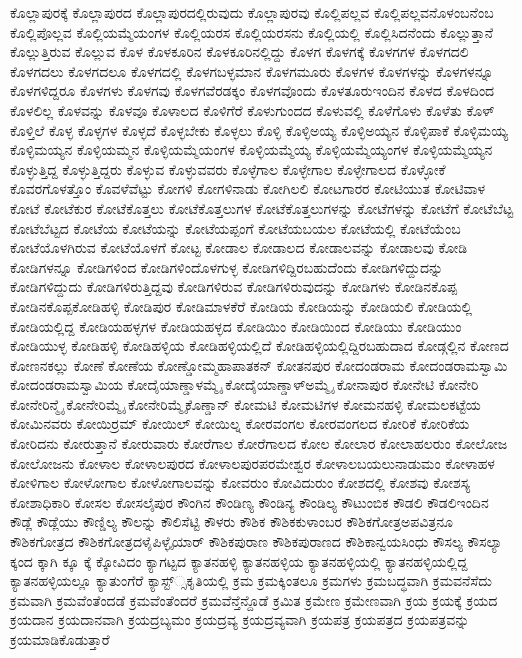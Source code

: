 {ಕೊಲ್ಲಾಪುರಕ್ಕೆ
ಕೊಲ್ಲಾಪುರದ
ಕೊಲ್ಲಾಪುರದಲ್ಲಿರುವುದು
ಕೊಲ್ಲಾಪುರವು
ಕೊಲ್ಲಿಪಲ್ಲವ
ಕೊಲ್ಲಿಪಲ್ಲವನೊಳಂಬನೆಂಬ
ಕೊಲ್ಲಿಪೊಲ್ಲವ
ಕೊಲ್ಲಿಯಮ್ಮೆಯಂಗಳ
ಕೊಲ್ಲಿಯರಸ
ಕೊಲ್ಲಿಯರಸನು
ಕೊಲ್ಲಿಯಲ್ಲಿ
ಕೊಲ್ಲಿಸಿದನೆಂದು
ಕೊಲ್ಲುತ್ತಾನೆ
ಕೊಲ್ಲುತ್ತಿರುವ
ಕೊಲ್ಲುವ
ಕೊಳ
ಕೊಳಕೂರಿನ
ಕೊಳಕೂರಿನಲ್ಲಿದ್ದು
ಕೊಳಗ
ಕೊಳಗಕ್ಕೆ
ಕೊಳಗಗಳ
ಕೊಳಗದಲಿ
ಕೊಳಗದಲು
ಕೊಳಗದಲೂ
ಕೊಳಗದಲ್ಲಿ
ಕೊಳಗಬಳ್ಳಮಾನ
ಕೊಳಗಮೂರು
ಕೊಳಗಳ
ಕೊಳಗಳನ್ನು
ಕೊಳಗಳನ್ನೂ
ಕೊಳಗಳಿದ್ದರೂ
ಕೊಳಗಳು
ಕೊಳಗವು
ಕೊಳಗವೆರಡಕ್ಕಂ
ಕೊಳಗವೊಂದು
ಕೊಳತೂರುಇಂದಿನ
ಕೊಳದ
ಕೊಳದಿಂದ
ಕೊಳಲಿಲ್ಲ
ಕೊಳವನ್ನು
ಕೊಳವೂ
ಕೊಳಾಲದ
ಕೊಳಿಗೆರೆ
ಕೊಳುಗುಂದದ
ಕೊಳುವಲ್ಲಿ
ಕೊಳೆಗೊಳು
ಕೊಳೆತು
ಕೊಳ್
ಕೊಳ್ತಿಲೆ
ಕೊಳ್ಳ
ಕೊಳ್ಳಗಳ
ಕೊಳ್ಳದೆ
ಕೊಳ್ಳಬೇಕು
ಕೊಳ್ಳಲು
ಕೊಳ್ಳಿ
ಕೊಳ್ಳಿಅಯ್ಯ
ಕೊಳ್ಳಿಅಯ್ಯನ
ಕೊಳ್ಳಿಪಾಕೆ
ಕೊಳ್ಳಿಮಯ್ಯ
ಕೊಳ್ಳಿಮಯ್ಯನ
ಕೊಳ್ಳಿಯಮ್ಮನ
ಕೊಳ್ಳಿಯಮ್ಮೆಯಂಗಳ
ಕೊಳ್ಳಿಯಮ್ಮೆಯ್ಯ
ಕೊಳ್ಳಿಯಮ್ಮೆಯ್ಯಂಗಳ
ಕೊಳ್ಳಿಯಮ್ಮೆಯ್ಯನ
ಕೊಳ್ಳುತ್ತಿದ್ದ
ಕೊಳ್ಳುತ್ತಿದ್ದರು
ಕೊಳ್ಳುವ
ಕೊಳ್ಳುವವರು
ಕೊಳ್ಳೆಗಾಲ
ಕೊಳ್ಳೇಗಾಲ
ಕೊಳ್ಳೇಗಾಲದ
ಕೊಳ್ಳೋಕೆ
ಕೊವರಗೊಳತ್ತೊಂ
ಕೊವಳೆವೆಟ್ಟು
ಕೋಗಳಿ
ಕೋಗಳಿನಾಡು
ಕೋಗಿಲಲಿ
ಕೋಟಗಾರರ
ಕೋಟಿಯುತ
ಕೋಟಿವಾಳ
ಕೋಟೆ
ಕೋಟೆಕುರ
ಕೋಟೆಕೊತ್ತಲು
ಕೋಟೆಕೊತ್ತಲುಗಳ
ಕೋಟೆಕೊತ್ತಲುಗಳನ್ನು
ಕೋಟೆಗಳನ್ನು
ಕೋಟೆಗೆ
ಕೋಟೆಬೆಟ್ಟ
ಕೋಟೆಬೆಟ್ಟದ
ಕೋಟೆಯ
ಕೋಟೆಯನ್ನು
ಕೋಟೆಯಪ್ಪಂಗೆ
ಕೋಟೆಯಬಯಲ
ಕೋಟೆಯಲ್ಲಿ
ಕೋಟೆಯೆಂಬ
ಕೋಟೆಯೊಳಗಿರುವ
ಕೋಟೆಯೊಳಗೆ
ಕೋಟ್ಟ
ಕೋಡಾಲ
ಕೋಡಾಲದ
ಕೋಡಾಲವನ್ನು
ಕೋಡಾಲವು
ಕೋಡಿ
ಕೋಡಿಗಳನ್ನೂ
ಕೋಡಿಗಳಿಂದ
ಕೋಡಿಗಳಿಂದೊಳಗುಳ್ಳ
ಕೋಡಿಗಳಿದ್ದಿರಬಹುದೆಂದು
ಕೋಡಿಗಳಿದ್ದುದನ್ನು
ಕೋಡಿಗಳಿದ್ದುದು
ಕೋಡಿಗಳಿರುತ್ತಿದ್ದವು
ಕೋಡಿಗಳಿರುವ
ಕೋಡಿಗಳಿರುವುದನ್ನು
ಕೋಡಿಗಳು
ಕೋಡಿನಕೊಪ್ಪ
ಕೋಡಿನಕೊಪ್ಪಕೋಡಿಹಳ್ಳಿ
ಕೋಡಿಪುರ
ಕೋಡಿಮಾಳಕೆರೆ
ಕೋಡಿಯ
ಕೋಡಿಯನ್ನು
ಕೋಡಿಯಲಿ
ಕೋಡಿಯಲ್ಲಿ
ಕೋಡಿಯಲ್ಲಿದ್ದ
ಕೋಡಿಯಹಳ್ಳಗಳ
ಕೋಡಿಯಹಳ್ಳದ
ಕೋಡಿಯಿಂ
ಕೋಡಿಯಿಂದ
ಕೋಡಿಯು
ಕೋಡಿಯುಂ
ಕೋಡಿಯುಳ್ಳ
ಕೋಡಿಹಳ್ಳಿ
ಕೋಡಿಹಳ್ಳಿಯ
ಕೋಡಿಹಳ್ಳಿಯಲ್ಲಿದೆ
ಕೋಡಿಹಳ್ಳಿಯಲ್ಲಿದ್ದಿರಬಹುದಾದ
ಕೋಡ್ಗಲ್ಲಿನ
ಕೋಣದ
ಕೋಣನಕಲ್ಲು
ಕೋಣೆ
ಕೋಣೆಯ
ಕೋಣ್ಡೋಮ್ಮಹಾಪಾತಕನ್
ಕೋತನಪುರ
ಕೋದಂಡರಾಮ
ಕೋದಂಡರಾಮಸ್ವಾಮಿ
ಕೋದಂಡರಾಮಸ್ವಾಮಿಯ
ಕೋದೈಯಾಣ್ಡಾಳಮ್ಮೈ
ಕೋದೈಯಾಣ್ಡಾಳ್ಅಮ್ಮೈ
ಕೋನಾಪುರ
ಕೋನೇಟಿ
ಕೋನೇರಿ
ಕೋನೇರಿನ್ಮೈ
ಕೋನೇರಿಮ್ಮೈ
ಕೋನೇರಿಮ್ಮೈಕೊಣ್ಡಾನ್
ಕೋಮಟಿ
ಕೋಮಟಿಗಳ
ಕೋಮನಹಳ್ಳಿ
ಕೋಮಲಕಟ್ಟೆಯ
ಕೋಮಿನವರು
ಕೋಯಿರ್ರಮ್
ಕೋಯಿಲ್
ಕೋಯಿಲ್ನ
ಕೋರವಂಗಲ
ಕೋರವಂಗಲದ
ಕೋರಿಕೆ
ಕೋರಿಕೆಯ
ಕೋರಿದನು
ಕೋರುತ್ತಾನೆ
ಕೋರುವಾರು
ಕೋರೆಗಾಲ
ಕೋರೆಗಾಲದ
ಕೋಲ
ಕೋಲಾರ
ಕೋಲಾಹಲರುಂ
ಕೋಲೋಜ
ಕೋಲೋಜನು
ಕೋಳಾಲ
ಕೋಳಾಲಪುರದ
ಕೋಳಾಲಪುರಪರಮೇಶ್ವರ
ಕೋಳಾಲಬಯಲುನಾಡುಮಂ
ಕೋಳಾಹಳ
ಕೋಳಿಗಾಲ
ಕೋಳೋಗಾಲ
ಕೋಳೋಗಾಲವನ್ನು
ಕೋವರುಂ
ಕೋವಿದುರುಂ
ಕೋಶದಲ್ಲಿ
ಕೋಶವು
ಕೋಶಸ್ಯ
ಕೋಶಾಧಿಕಾರಿ
ಕೋಸಲ
ಕೋಸಲೈಪುರ
ಕೌಂಗಿನ
ಕೌಂಡಿಣ್ಯ
ಕೌಂಡಿನ್ಯ
ಕೌಂಡಿಲ್ಯ
ಕೌಟುಂಬಿಕ
ಕೌಡಲಿ
ಕೌಡಲಿಇಂದಿನ
ಕೌಡ್ಲೆ
ಕೌಡ್ಲೆಯು
ಕೌಣ್ಡಿಲ್ಯ
ಕೌಲನ್ನು
ಕೌಲಿಸೆಟ್ಟಿ
ಕೌಳರು
ಕೌಶಿಕ
ಕೌಶಿಕಕುಳಾಂಬರ
ಕೌಶಿಕಗೋತ್ರಅಪವಿತ್ರನೂ
ಕೌಶಿಕಗೋತ್ರದ
ಕೌಶಿಕಗೋತ್ರದಳೈಪಿಳ್ಳೈಯಾರ್
ಕೌಶಿಕಪುರಾಣ
ಕೌಶಿಕಪುರಾಣದ
ಕೌಶಿಕಾನ್ವಯಸಿಂಧು
ಕೌಸಲ್ಯ
ಕೌಸಲ್ಯಾ
ಕ್ಕಂದ
ಕ್ಕಾಗಿ
ಕ್ಕೂ
ಕ್ಕೆ
ಕ್ಕೋವಿದಂ
ಕ್ಯಾಗಟ್ಟದ
ಕ್ಯಾತನಹಳ್ಳಿ
ಕ್ಯಾತನಹಳ್ಳಿಯ
ಕ್ಯಾತನಹಳ್ಳಿಯಲ್ಲಿ
ಕ್ಯಾತನಹಳ್ಳಿಯಲ್ಲಿದ್ದ
ಕ್ಯಾತನಹಳ್ಳಿಯಲ್ಲೂ
ಕ್ಯಾತುಂಗೆರೆ
ಕ್ಯಾಸ್ಟ್್ಸಕೃತಿಯಲ್ಲಿ
ಕ್ರಮ
ಕ್ರಮಕ್ಕಿಂತಲೂ
ಕ್ರಮಗಳು
ಕ್ರಮಬದ್ಧವಾಗಿ
ಕ್ರಮವನೆಸೆದು
ಕ್ರಮವಾಗಿ
ಕ್ರಮವೆಂತೆಂದಡೆ
ಕ್ರಮವೆಂತೆಂದರೆ
ಕ್ರಮವೆನ್ತೆನ್ದೊಡೆ
ಕ್ರಮಿತ
ಕ್ರಮೇಣ
ಕ್ರಮೇಣವಾಗಿ
ಕ್ರಯ
ಕ್ರಯಕ್ಕೆ
ಕ್ರಯದ
ಕ್ರಯದಾನ
ಕ್ರಯದಾನವಾಗಿ
ಕ್ರಯದ್ರಬ್ಯಮಂ
ಕ್ರಯದ್ರವ್ಯ
ಕ್ರಯದ್ರವ್ಯವಾಗಿ
ಕ್ರಯಪತ್ರ
ಕ್ರಯಪತ್ರದ
ಕ್ರಯಪತ್ರವನ್ನು
ಕ್ರಯಮಾಡಿಕೊಡುತ್ತಾರೆ
}
